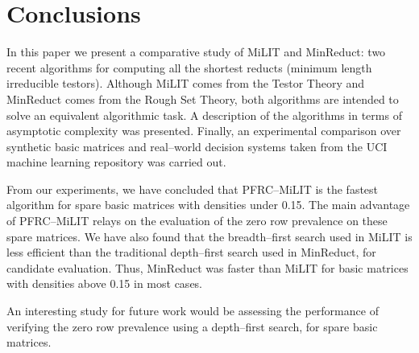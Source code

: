 \documentclass[citenumber]{llncs}
\begin{document}
	
%
\section{Conclusions} \label{conclusions}
%	
	In this paper we present a comparative study of MiLIT and MinReduct: two recent algorithms for computing all the shortest reducts (minimum length irreducible testors). Although MiLIT comes from the Testor Theory and MinReduct comes from the Rough Set Theory, both algorithms are intended to solve an equivalent algorithmic task. A description of the algorithms in terms of asymptotic complexity was presented. Finally, an experimental comparison over synthetic basic matrices and real--world decision systems taken from the UCI machine learning repository was carried out. 
	
	From our experiments, we have concluded that PFRC--MiLIT is the fastest algorithm for spare basic matrices with densities under 0.15. The main advantage of PFRC--MiLIT relays on the evaluation of the zero row prevalence on these spare matrices. We have also found that the breadth--first search used in MiLIT is less efficient than the traditional depth--first search used in MinReduct, for candidate evaluation. Thus, MinReduct was faster than MiLIT for basic matrices with densities above 0.15 in most cases.
	
	An interesting study for future work would be assessing the performance of verifying the zero row prevalence using a depth--first search, for spare basic matrices.
 
%
{}

\end{document}
